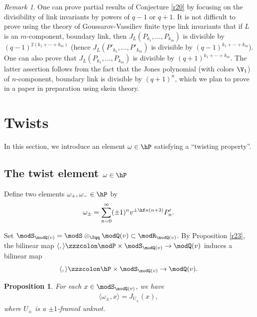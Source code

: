 \documentclass{amsart}
\numberwithin{equation}{section}
\numberwithin{figure}{section}
\theoremstyle{plain}
\newtheorem{proposition}[theorem]{Proposition}
\theoremstyle{definition}
\theoremstyle{remark}
\newtheorem{remark}[theorem]{Remark}
\begin{document}
\begin{remark}
  \label{r21}
  One can prove partial results of Conjecture \ref{r20} by focusing on
  the divisibility of link invariants by powers of $q-1$ or $q+1$.  It
  is not difficult to prove using the theory of Goussarov-Vassiliev
  finite type link invariants that if $L$ is an $m$-component,
  boundary link, then $J_L(P_{k_1},\ldots,P_{k_m})$ is divisible by
  $(q-1)^{2(k_1+\cdots+k_m)}$ (hence $J_L(P'_{k_1},\ldots,P'_{k_m})$ is
  divisible by $(q-1)^{k_1+\cdots+k_m}$).  One can also prove that
  $J_L(P_{k_1},\ldots,P_{k_m})$ is divisible by $(q+1)^{k_1+\cdots+k_m}$.  The
  latter assertion follows from the fact that the Jones polynomial
  (with colors $\V_1$) of $n$-component, boundary link is divisible by
  $(q+1)^n$, which we plan to prove in a paper in preparation
  \cite{H:spanning} using skein theory.
\end{remark}

\section{Twists}
\label{sec9}

In this section, we introduce an element $\omega \in \hP$ satisfying a
``twisting property''.

\subsection{The twist element $\omega \in \hP$}
\label{sec:twist-element-hr-1}

Define two elements $\omega _+,\omega _-\in \hP$ by
\begin{equation*}
  \omega _\pm =\sum_{n=0}^\infty (\pm 1)^n v^{\pm \hf n(n+3)}P'_n.
\end{equation*}

Set $\modS _{\modQ (v)}=\modS \otimes _{\Zqq}\modQ (v)\subset \modR _{\modQ (v)}$.  By Proposition \ref{r23},
the bilinear map $\langle ,\rangle \zzzcolon \modP \times \modS _{\modQ (v)}\rightarrow \modQ (v)$ induces a bilinear map
\begin{equation*}
  \langle ,\rangle \zzzcolon \hP\times \modS _{\modQ (v)}\rightarrow \modQ (v).
\end{equation*}

\begin{proposition}
  \label{thm:38}
  For each $x\in \modS _{\modQ (v)}$, we have
  \begin{gather}
    \label{eq:67}
    \langle \omega _\pm ,x\rangle =J_{U_\pm }(x),
  \end{gather}
  where $U_\pm $ is a $\pm 1$-framed unknot.
\end{proposition}
\end{document}
